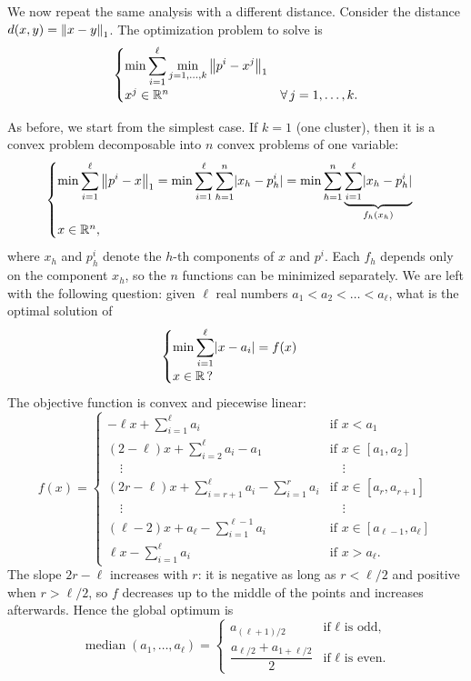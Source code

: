 We now repeat the same analysis with a different distance. Consider the distance $d(x,y) = \left\lVert x-y \right\rVert_1$. The optimization problem to solve is
\[
\begin{cases}
\displaystyle \min \sum_{i=1}^{\ell} \min_{j=1,\dots,k} \left\lVert p^i - x^j \right\rVert_1\\[1ex]
x^j \in \mathbb{R}^n & \forall\, j=1,\dots,k.
\end{cases}
\]

As before, we start from the simplest case. If $k=1$ (one cluster), then it is a convex problem decomposable into $n$ convex problems of one variable:
\begin{equation}\label{eq:clust-l1-one}
\begin{cases}
\displaystyle \min \sum_{i=1}^{\ell} \left\lVert p^i - x \right\rVert_1 = \min \sum_{i=1}^{\ell}\sum_{h=1}^{n} \lvert x_h - p^i_h \rvert = \min \sum_{h=1}^{n} \underbrace{\sum_{i=1}^{\ell} \lvert x_h - p^i_h \rvert}_{f_h(x_h)}\\[1ex]
x \in \mathbb{R}^n,
\end{cases}
\end{equation}
where $x_h$ and $p^i_h$ denote the $h$-th components of $x$ and $p^i$. Each $f_h$ depends only on the component $x_h$, so the $n$ functions can be minimized separately. We are left with the following question: given $\ell$ real numbers $a_1 < a_2 < \dots < a_\ell$, what is the optimal solution of
\[
\begin{cases}
\displaystyle \min \sum_{i=1}^{\ell} \lvert x - a_i \rvert = f(x)\\[1ex]
x \in \mathbb{R} \,?
\end{cases}
\]
The objective function is convex and piecewise linear:
\[
f(x) =
\begin{cases}
-\ell x + \sum_{i=1}^{\ell} a_i & \text{if } x < a_1\\
(2-\ell)x + \sum_{i=2}^{\ell} a_i - a_1 & \text{if } x \in [a_1,a_2]\\
\quad\vdots & \quad\vdots\\
(2r-\ell)x + \sum_{i=r+1}^{\ell} a_i - \sum_{i=1}^{r} a_i & \text{if } x \in [a_r,a_{r+1}]\\
\quad\vdots & \quad\vdots\\
(\ell-2)x + a_\ell - \sum_{i=1}^{\ell-1} a_i & \text{if } x \in [a_{\ell-1},a_\ell]\\
\ell x - \sum_{i=1}^{\ell} a_i & \text{if } x > a_\ell.
\end{cases}
\]
The slope $2r-\ell$ increases with $r$: it is negative as long as $r < \ell/2$ and positive when $r > \ell/2$, so $f$ decreases up to the middle of the points and increases afterwards. Hence the global optimum is
\[
\operatorname{median}(a_1,\dots,a_\ell) =
\begin{cases}
a_{(\ell+1)/2} & \text{if $\ell$ is odd,}\\[1ex]
\dfrac{a_{\ell/2} + a_{1+\ell/2}}{2} & \text{if $\ell$ is even.}
\end{cases}
\]

